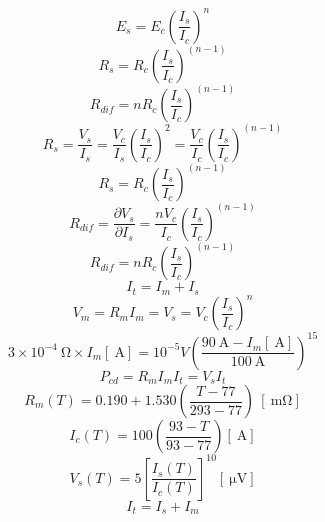 \begin{equation}%
E_s=E_c(\frac{I_s}{I_c})^n
\end{equation}
\begin{equation}%
R_s=R_c(\frac{I_s}{I_c})^{(n-1)}
\end{equation}
\begin{equation}%
R_{dif}=nR_c(\frac{I_s}{I_c})^{(n-1)}
\end{equation}
\begin{equation}%
R_s=\frac{V_s}{I_s}=\frac{V_c}{I_s}(\frac{I_s}{I_c})^2=\frac{V_c}{I_c}(\frac{I_s}{I_c})^{(n-1)}
\end{equation}
\begin{equation}%
R_s=R_c(\frac{I_s}{I_c})^{(n-1)}
\end{equation}
\begin{equation}%
R_{dif}=\frac{\partial V_s}{\partial I_s}=\frac{nV_c}{I_c}(\frac{I_s}{I_c})^{(n-1)}
\end{equation}
\begin{equation}%
R_{dif}=nR_c(\frac{I_s}{I_c})^{(n-1)}
\end{equation}
\begin{equation}%
I_t=I_m+I_s
\end{equation}
\begin{equation}%
V_m=R_mI_m=V_s=V_c(\frac{I_s}{I_c})^{n}
\end{equation}
\begin{equation}%
3\times 10^{-4}\ \mathrm{\Omega}\times I_m[\ \mathrm{A}]=10^{-5}V(\frac{90\ \mathrm{A}-I_m[\ \mathrm{A}]}{100\ \mathrm{A}})^{15}
\end{equation}
\begin{equation}%
P_{cd}=R_mI_mI_t=V_sI_t
\end{equation}
\begin{equation}%
R_m(T)=0.190+1.530(\frac{T-77}{293-77})\ [\ \mathrm{m\Omega}]
\end{equation}
\begin{equation}%
I_c(T)=100(\frac{93-T}{93-77})[\ \mathrm{A}]
\end{equation}
\begin{equation}%
V_s(T)=5[\frac{I_s(T)}{I_c(T)}]^{10} [\ \mathrm{\mu V}]
\end{equation}
\begin{equation}%
I_t=I_s+I_m
\end{equation}
